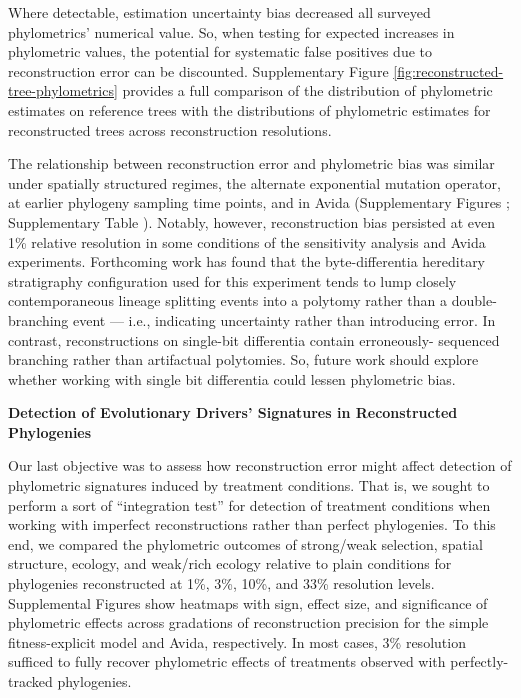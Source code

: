 Where detectable, estimation uncertainty bias decreased all surveyed phylometrics' numerical value.
So, when testing for expected increases in phylometric values, the potential for systematic false positives due to reconstruction error can be discounted.
Supplementary Figure \ref{fig:reconstructed-tree-phylometrics} provides a full comparison of the distribution of phylometric estimates on reference trees with the distributions of phylometric estimates for reconstructed trees across reconstruction resolutions.

The relationship between reconstruction error and phylometric bias was similar under spatially structured regimes, the alternate exponential mutation operator, at earlier phylogeny sampling time points, and in Avida (Supplementary Figures ; Supplementary Table ).
Notably, however, reconstruction bias persisted at even 1\% relative resolution in some conditions of the sensitivity analysis and Avida experiments.
Forthcoming work has found that the byte-differentia hereditary stratigraphy configuration used for this experiment tends to lump closely contemporaneous lineage splitting events into a polytomy rather than a double-branching event --- i.e., indicating uncertainty rather than introducing error.
In contrast, reconstructions on single-bit differentia contain erroneously- sequenced branching rather than artifactual polytomies.
So, future work should explore whether working with single bit differentia could lessen phylometric bias.

\textbf{Detection of Evolutionary Drivers' Signatures in Reconstructed Phylogenies}

Our last objective was to assess how reconstruction error might affect detection of phylometric signatures induced by treatment conditions.
That is, we sought to perform a sort of ``integration test'' for detection of treatment conditions when working with imperfect reconstructions rather than perfect phylogenies.
To this end, we compared the phylometric outcomes of strong/weak selection, spatial structure, ecology, and weak/rich ecology relative to plain conditions for phylogenies reconstructed at 1\%, 3\%, 10\%, and 33\% resolution levels.
Supplemental Figures  show heatmaps with sign, effect size, and significance of phylometric effects across gradations of reconstruction precision for the simple fitness-explicit model and Avida, respectively.
In most cases, 3\% resolution sufficed to fully recover phylometric effects of treatments observed with perfectly-tracked phylogenies.

